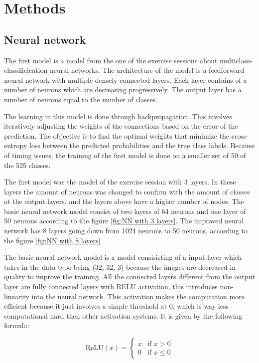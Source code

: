 \section{Methods}
\subsection{Neural network}
The first model is a model from the one of the exercise sessions about multiclass-classificication neural networks. The architecture of the model is a feedforward neural network with multiple densely connected layers. Each layer contains of a number of neurons which are decreasing progressively. The output layer has a number of neurons equal to the number of classes.

The learning in this model is done through backpropagation. This involves iteratively adjusting the weights of the connections based on the error of the prediction. The objective is to find the optimal weights that minimize the cross-entropy loss between the predicted probabilities and the true class labels. Because of timing issues, the training of the first model is done on a smaller set of 50 of the 525 classes. 

The first model was the model of the exercise session with 3 layers. In these layers the amount of neurons was changed to confirm with the amount of classes at the output layers, and the layers above have a higher number of nodes. The basic neural network model consist of two layers of 64 neurons and one layer of 50 neurons according to the figure \ref{fig:NN with 3 layers}. The improved neural network has 8 layers going down from 1024 neurons to 50 neurons, according to the figure \ref{fig:NN with 8 layers}

The basic neural network model is a model consisisting of a input layer which takes in the data type being (32, 32, 3) because the images are decreased in quality to improve the training. All the connected layers different from the output layer are fully connected layers with RELU activation,  this introduces non-linearity into the neural network. This activation makes the computation more efficient because it just involves a simple threshold at 0, which is way less computational hard then other activation systems. It is given by the following formula:

\[
\text{ReLU}(x) = \begin{cases}
    x & \text{if } x > 0 \\
    0 & \text{if } x \leq 0
\end{cases}
\]


